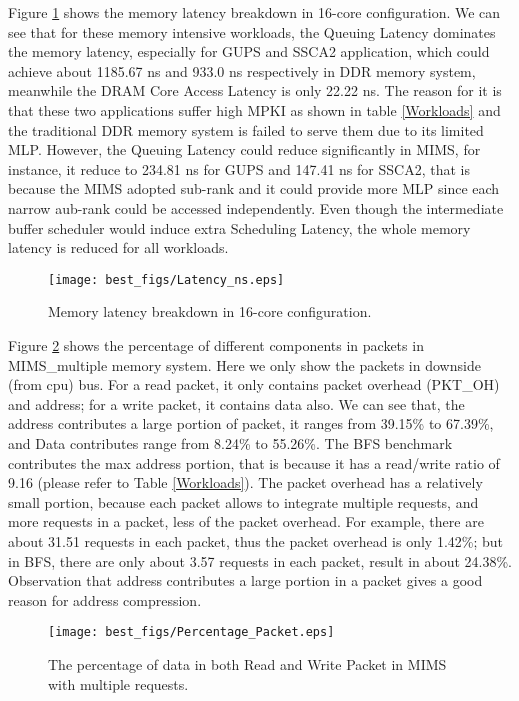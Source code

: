 \documentclass[pageno]{jpaper}
\begin{document}
Figure \ref{Latency_ns} shows the memory latency breakdown in 16-core configuration. We can see that for these memory intensive workloads, the Queuing Latency dominates the memory latency, especially for GUPS and SSCA2 application, which could achieve about 1185.67 ns and 933.0 ns respectively in DDR memory system, meanwhile the DRAM Core Access Latency is only 22.22 ns. The reason for it is that these two applications suffer high MPKI as shown in table \ref{Workloads} and the traditional DDR memory system is failed to serve them due to its limited MLP. However, the Queuing Latency could reduce significantly in MIMS, for instance, it reduce to 234.81 ns for GUPS and 147.41 ns for SSCA2, that is because the MIMS adopted sub-rank and it could provide more MLP since each narrow aub-rank could be accessed independently. Even though the intermediate buffer scheduler would induce extra Scheduling Latency, the whole memory latency is reduced for all workloads.

\begin{figure}
  \centering
  \texttt{[image: best\_figs/Latency\_ns.eps]}
  \caption{Memory latency breakdown in 16-core configuration.}
  \label{Latency_ns}
\end{figure}



Figure \ref{Percentage_Packet} shows the percentage of different components in packets in MIMS\_multiple memory system. Here we only show the packets in downside (from cpu) bus. For a read packet, it only contains packet overhead (PKT\_OH) and address; for a write packet, it contains data also. We can see that, the address contributes a large portion of packet, it ranges from 39.15\% to 67.39\%, and Data contributes range from 8.24\% to 55.26\%. The BFS benchmark contributes the max address portion, that is because it has a read/write ratio of 9.16 (please refer to Table \ref{Workloads}). The packet overhead has a relatively small portion, because each packet allows to integrate multiple requests, and more requests in a packet, less of the packet overhead. For example, there are about 31.51 requests in each packet, thus the packet overhead is only 1.42\%; but in BFS, there are only about 3.57 requests in each packet, result in about 24.38\%. Observation that address contributes a large portion in a packet gives a good reason for address compression.

\begin{figure}
  \centering
  \texttt{[image: best\_figs/Percentage\_Packet.eps]}
  \caption{The percentage of data in both Read and Write Packet in MIMS with multiple requests.}
  \label{Percentage_Packet}
\end{figure}
\end{document}

